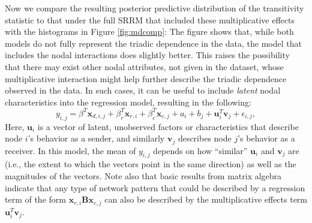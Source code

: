 \documentclass[11pt]{article}\usepackage[]{graphicx}\usepackage[]{color}
\newcommand{\bl}[1]{{\mathbf #1}}
\begin{document}
Now we compare the resulting posterior predictive distribution of the transitivity statistic
to that under the full SRRM that included these multiplicative effects with the
histograms  in Figure \ref{fig:mdcomp}:
The figure shows that, while both models do not fully represent the triadic dependence 
in the data, the model that includes the nodal interactions does slightly better. 
This raises the possibility that there may exist other nodal attributes, not given 
in the dataset, whose multiplicative interaction might help further describe the 
triadic dependence observed in the data. 
In such cases, 
it can be useful to include \emph{latent} nodal 
characteristics into the regression model, resulting in the following:
\begin{equation}
 y_{i,j} = \beta^T \bl x_{d,i,j} + \beta_r^T \bl x_{r,i} +\beta_c^T \bl x_{c,j} +  a_i + b_j +  \bl u_i^T \bl v_j  +  \epsilon_{i,j} ,  
\label{eqn:ame}
\end{equation}
Here,  $\bl u_i$  is a vector of latent, unobserved factors or characteristics 
that describe node $i$'s behavior as a sender, and 
similarly $\bl v_j$  describes node $j$'s behavior as a receiver. 
In this model, the mean of $y_{i,j}$ 
depends on how ``similar'' $\bl u_i$ and $\bl v_j$ are (i.e., the extent to 
which the vectors point in the same direction) as well as the magnitudes of the 
vectors. 
Note also
 that  basic results from matrix algebra indicate that 
any type of network pattern that could be described by a regression 
term of the form  $\bl x_{r,i} \bl B \bl x_{c,j}$ can also 
be described by the multiplicative effects term $\bl u_i^T \bl v_j$. 
\end{document}

